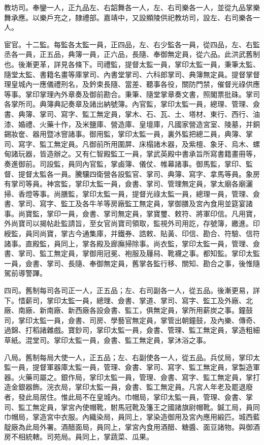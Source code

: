 教坊司。奉鑾一人，正九品左、右韶舞各一人，左、右司樂各一人，並從九品掌樂舞承應。以樂戶充之，隸禮部。嘉靖中，又設顯陵供祀教坊司，設左、右司樂各一人。

宦官。十二監。每監各太監一員，正四品，左、右少監各一員，從四品，左、右監丞各一員，正五品，典簿一員，正六品，長隨、奉御無定員，從六品。此洪武舊制也。後漸更革，詳見各條下。司禮監，提督太監一員，掌印太監一員，秉筆太監、隨堂太監、書籍名畫等庫掌司、內書堂掌司、六科郎掌司、典簿無定員。提督掌督理皇城內一應儀禮刑名，及鈐束長隨、當差、聽事各役，關防門禁，催督光祿供應等事。掌印掌理內外章奏及御前勘合。秉筆、隨堂掌章奏文書，照閣票批硃。掌司各掌所司。典簿典記奏章及諸出納號簿。內官監，掌印太監一員，總理、管理、僉書、典簿、掌司、寫字、監工無定員，掌木、石、瓦、土、塔材、東行、西行、油漆、婚禮、火藥十作，及米鹽庫、營造庫、皇壇庫，凡國家營造宮室、陵墓，并銅錫妝奩、器用暨冰窨諸事。御用監，掌印太監一員，裏外監把總二員，典簿、掌司、寫字、監工無定員。凡御前所用圍屏、床榻諸木器，及紫檀、象牙、烏木、螺甸諸玩器，皆造辦之。又有仁智殿監工一員，掌武英殿中書承旨所寫書籍畫冊等，奏進御前。司設監，員同內官監，掌鹵簿、儀仗、帷幕諸事。御馬監，掌印、監督、提督太監各一員。騰驤四衛營各設監官、掌司、典簿、寫字、拿馬等員。象房有掌司等員。神宮監，掌印太監一員，僉書、掌司、管理無定員，掌太廟各廟灑掃、香燈等事。尚膳監，掌印太監一員，提督光祿太監一員，總理一員，管理、僉書、掌司、寫字、監工及各牛羊等房廠監工無定員，掌御膳及宮內食用並筵宴諸事。尚寶監，掌印一員，僉書、掌司無定員，掌寶璽、敕符、將軍印信。凡用寶，外尚寶司以揭帖赴監請旨，至女官尚寶司領取，監視外司用訖，存號簿，繳進。印綬監，員同尚寶，掌古今通集庫，并鐵券、誥敕、貼黃、印信、勘合、符驗、信符諸事。直殿監，員同上，掌各殿及廊廡掃除事。尚衣監，掌印太監一員，管理、僉書、掌司、監工無定員，掌御用冠冕、袍服及屨舄、靴襪之事。都知監。掌印太監一員，僉書、掌司、長隨、奉御無定員，舊掌各監行移、關知、勘合之事，後惟隨駕前導警蹕。

四司。舊制每司各司正一人，正五品；左、右司副各一人，從五品。後漸更易，詳下。惜薪司，掌印太監一員，總理、僉書、掌道、掌司、寫字、監工及外廠、北廠、南廠、新南廠、新西廠各設僉書、監工，俱無定員，掌所用薪炭之事。鐘鼓司，掌印太監一員，僉書、司房、學藝官無定員，掌管出朝鐘鼓，及內樂、傳奇、過錦、打稻諸雜戲。寶鈔司，掌印太監一員，僉書、管理、監工無定員，掌造粗細草紙。混堂司。掌印太監一員，僉書、監工無定員，掌沐浴之事。

八局。舊制每局大使一人，正五品；左、右副使各一人，從五品。兵仗局，掌印太監一員，提督軍器庫太監一員，管理、僉書、掌司、寫字、監工無定員，掌製造軍器。火藥司屬之。銀作局，掌印太監一員，管理、僉書、寫字、監工無定員，掌打造金銀器飾。浣衣局，掌印太監一員，僉書、監工無定員。凡宮人年老及罷退廢者，發此局居住。惟此局不在皇城內。巾帽局，掌印太監一員，管理、僉書、掌司、監工無定員，掌宮內使帽靴，駙馬冠靴及籓王之國諸旗尉帽靴。鍼工局，員同巾帽局，掌造宮中衣服。內織染局，員同上，掌染造御用及宮內應用緞匹。城西藍靛廠為此局外署。酒醋面局，員同上，掌宮內食用酒醋、糖醬、面豆諸物。與御酒房不相統轄。司苑局。員同上，掌蔬菜、瓜果。

